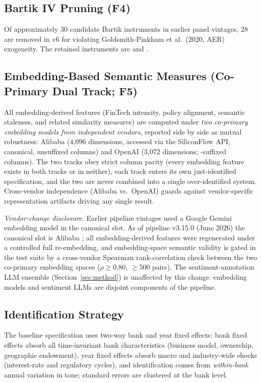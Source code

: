\subsection{Bartik IV Pruning (F4)}
Of approximately 30 candidate Bartik instruments in earlier panel
vintages, 28 are removed in v6 for violating Goldsmith-Pinkham et al.\
(2020, AER) exogeneity. The retained instruments are
 and .

\subsection{Embedding-Based Semantic Measures (Co-Primary Dual Track; F5)}
All embedding-derived features (FinTech intensity, policy alignment,
semantic staleness, and related similarity measures) are computed
under \emph{two co-primary embedding models from independent vendors},
reported side by side as mutual robustness: Alibaba
 (4{,}096 dimensions, accessed via the
SiliconFlow API; canonical, unsuffixed columns) and OpenAI
 (3{,}072 dimensions; -suffixed
columns). The two tracks obey strict column parity (every embedding
feature exists in both tracks or in neither), each track enters its
own just-identified specification, and the two are never combined into
a single over-identified system. Cross-vendor independence
(Alibaba vs.\ OpenAI) guards against vendor-specific representation
artifacts driving any single result.

\emph{Vendor-change disclosure.} Earlier pipeline vintages used a
Google Gemini embedding model in the canonical slot. As of pipeline
v3.15.0 (June 2026) the canonical slot is Alibaba
; all embedding-derived features were
regenerated under a controlled full re-embedding, and embedding-space
semantic validity is gated in the test suite by a cross-vendor
Spearman rank-correlation check between the two co-primary embedding
spaces ($\rho \geq 0.80$, $\geq 500$ pairs). The sentiment-annotation LLM ensemble
(Section~\ref{sec:method}) is unaffected by this change: embedding
models and sentiment LLMs are disjoint components of the pipeline.

\subsection{Identification Strategy}\label{sec:ident}
The baseline specification uses two-way bank and year fixed effects:
bank fixed effects absorb all time-invariant bank characteristics
(business model, ownership, geographic endowment), year fixed effects
absorb macro and industry-wide shocks (interest-rate and regulatory
cycles), and identification comes from \emph{within-bank} annual
variation in tone; standard errors are clustered at the bank level.

